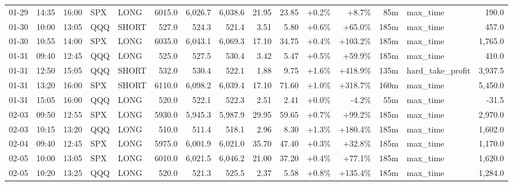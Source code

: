 \documentclass[11pt,a4paper,twoside]{article}
\begin{document}
\begin{landscape}
\begin{center}
\begin{longtable}{>{\color{txtmain}}l l l l l r r r r r r r r >{\color{txtmain}}l r}
01-29 & 14:35 & 16:00 & SPX & LONG & 6015.0 & 6,026.7 & 6,038.6 & 21.95 & 23.85 & \textcolor{wingreen}{+0.2\%} & \textcolor{wingreen}{+8.7\%} & 85m & max\_time & \textcolor{wingreen}{190.0} \\
01-30 & 10:00 & 13:05 & QQQ & SHORT & 527.0 & 524.3 & 521.4 & 3.51 & 5.80 & \textcolor{wingreen}{+0.6\%} & \textcolor{wingreen}{+65.0\%} & 185m & max\_time & \textcolor{wingreen}{457.0} \\
01-30 & 10:55 & 14:00 & SPX & LONG & 6035.0 & 6,043.1 & 6,069.3 & 17.10 & 34.75 & \textcolor{wingreen}{+0.4\%} & \textcolor{wingreen}{+103.2\%} & 185m & max\_time & \textcolor{wingreen}{1,765.0} \\
01-31 & 09:40 & 12:45 & QQQ & LONG & 525.0 & 527.5 & 530.4 & 3.42 & 5.47 & \textcolor{wingreen}{+0.5\%} & \textcolor{wingreen}{+59.9\%} & 185m & max\_time & \textcolor{wingreen}{410.0} \\
01-31 & 12:50 & 15:05 & QQQ & SHORT & 532.0 & 530.4 & 522.1 & 1.88 & 9.75 & \textcolor{wingreen}{+1.6\%} & \textcolor{wingreen}{+418.9\%} & 135m & hard\_take\_profit & \textcolor{wingreen}{3,937.5} \\
01-31 & 13:20 & 16:00 & SPX & SHORT & 6110.0 & 6,098.2 & 6,039.4 & 17.10 & 71.60 & \textcolor{wingreen}{+1.0\%} & \textcolor{wingreen}{+318.7\%} & 160m & max\_time & \textcolor{wingreen}{5,450.0} \\
01-31 & 15:05 & 16:00 & QQQ & LONG & 520.0 & 522.1 & 522.3 & 2.51 & 2.41 & \textcolor{wingreen}{+0.0\%} & \textcolor{lossred}{-4.2\%} & 55m & max\_time & \textcolor{lossred}{-31.5} \\
02-03 & 09:50 & 12:55 & SPX & LONG & 5930.0 & 5,945.3 & 5,987.9 & 29.95 & 59.65 & \textcolor{wingreen}{+0.7\%} & \textcolor{wingreen}{+99.2\%} & 185m & max\_time & \textcolor{wingreen}{2,970.0} \\
02-03 & 10:15 & 13:20 & QQQ & LONG & 510.0 & 511.4 & 518.1 & 2.96 & 8.30 & \textcolor{wingreen}{+1.3\%} & \textcolor{wingreen}{+180.4\%} & 185m & max\_time & \textcolor{wingreen}{1,602.0} \\
02-04 & 09:40 & 12:45 & SPX & LONG & 5975.0 & 6,001.9 & 6,021.0 & 35.70 & 47.40 & \textcolor{wingreen}{+0.3\%} & \textcolor{wingreen}{+32.8\%} & 185m & max\_time & \textcolor{wingreen}{1,170.0} \\
02-05 & 10:00 & 13:05 & SPX & LONG & 6010.0 & 6,021.5 & 6,046.2 & 21.00 & 37.20 & \textcolor{wingreen}{+0.4\%} & \textcolor{wingreen}{+77.1\%} & 185m & max\_time & \textcolor{wingreen}{1,620.0} \\
02-05 & 10:20 & 13:25 & QQQ & LONG & 520.0 & 521.3 & 525.5 & 2.37 & 5.58 & \textcolor{wingreen}{+0.8\%} & \textcolor{wingreen}{+135.4\%} & 185m & max\_time & \textcolor{wingreen}{1,284.0} \\

\end{longtable}
\end{center}
\end{landscape}
\end{document}
